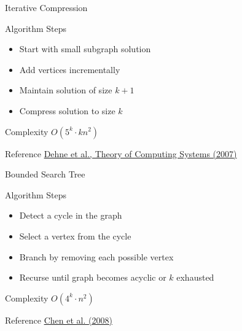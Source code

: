 \documentclass[aspectratio=169]{beamer}
\begin{document}
\begin{frame}{Iterative Compression}

\begin{block}{Algorithm Steps}
\begin{itemize}
\item Start with small subgraph solution
\item Add vertices incrementally
\item Maintain solution of size $k+1$
\item Compress solution to size $k$
\end{itemize}
\end{block}

\begin{exampleblock}{Complexity}
$O(5^k \cdot kn^2)$
\end{exampleblock}

\begin{alertblock}{Reference}
\href{https://dehne73176131.wordpress.com/wp-content/uploads/2017/12/1-45.pdf}{Dehne et al., Theory of Computing Systems (2007)}
\end{alertblock}

\end{frame}

\begin{frame}{Bounded Search Tree}

\begin{block}{Algorithm Steps}
\begin{itemize}
\item Detect a cycle in the graph
\item Select a vertex from the cycle
\item Branch by removing each possible vertex
\item Recurse until graph becomes acyclic or $k$ exhausted
\end{itemize}
\end{block}

\begin{exampleblock}{Complexity}
$O(4^k \cdot n^2)$
\end{exampleblock}

\begin{alertblock}{Reference}
\href{https://doi.org/10.1007/s00453-008-9215-6}{Chen et al. (2008)}
\end{alertblock}

\end{frame}
\end{document}

